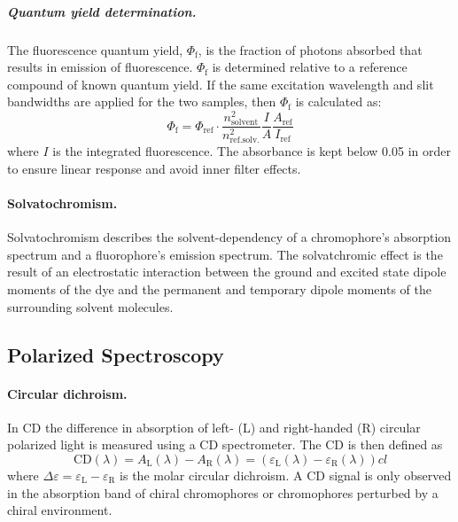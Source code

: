  \subparagraph{Quantum yield determination.} The fluorescence quantum yield, $\Phi_\mathrm{f}$, is the fraction of photons absorbed that results in emission of fluorescence. $\Phi_\mathrm{f}$ is determined relative to a reference compound of known quantum yield. If the same excitation wavelength and slit bandwidths are applied for the two samples, then $\Phi_\mathrm{f}$ is calculated as:
\begin{equation}
  \Phi_\mathrm{f} = \Phi_\mathrm{ref} \cdot
 \frac{n_\mathrm{solvent}^2}{n_\mathrm{ref.solv.}^2}
 \frac{I}{A}
 \frac{A_\mathrm{ref}}{I_\mathrm{ref}}
 \label{eqn:UdregningKvanteudbytte}
\end{equation}
 where $I$ is the integrated fluorescence. The absorbance is kept below 0.05 in order to ensure linear response and avoid inner filter effects.\cite{Lak}

 \paragraph{Solvatochromism.} Solvatochromism describes the solvent-dependency of a chromophore's absorption spectrum and a fluorophore's emission spectrum. The solvatchromic effect is the result of an electrostatic interaction between the ground and excited state dipole moments of the dye and the permanent and temporary dipole moments of the surrounding solvent molecules.

\subsection{Polarized Spectroscopy}
 \paragraph{Circular dichroism.} In CD the difference in absorption of left- (L) and right-handed (R) circular polarized light is measured using a CD spectrometer.\cite{Rodger1997} The CD is then defined as
\begin{equation}
 \mathrm{CD}(\lambda) = A_\mathrm{L}(\lambda) - A_\mathrm{R}(\lambda) = (\varepsilon_\mathrm{L}(\lambda)-\varepsilon_\mathrm{R}(\lambda))cl
\end{equation}
 where $\Delta\varepsilon=\varepsilon_\mathrm{L}-\varepsilon_\mathrm{R}$ is the molar circular dichroism. A CD signal is only observed in the absorption band of chiral chromophores or chromophores perturbed by a chiral environment.

